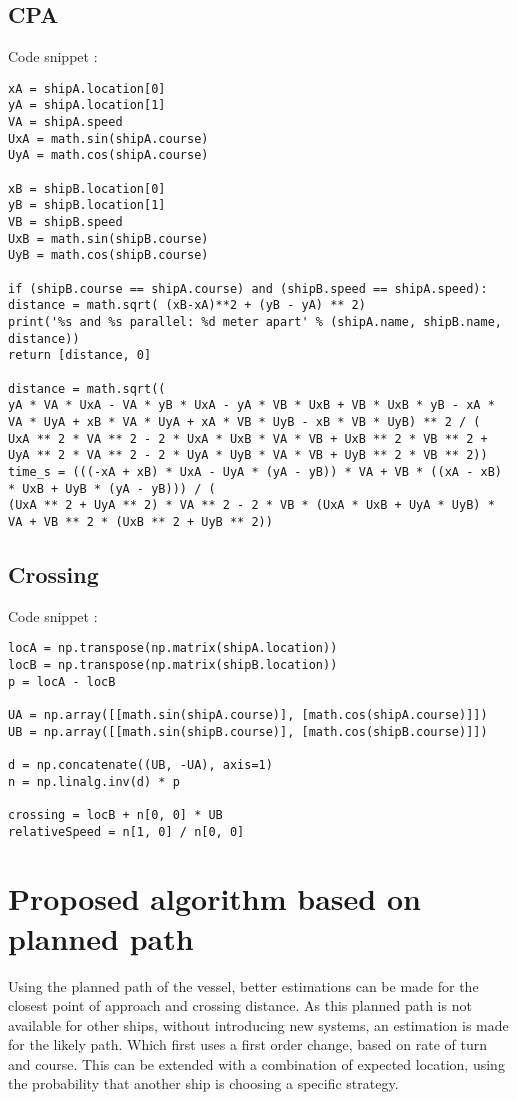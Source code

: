 \subsection{\ac{CPA}}
Code snippet :
\begin{lstlisting}
xA = shipA.location[0]
yA = shipA.location[1]
VA = shipA.speed
UxA = math.sin(shipA.course)
UyA = math.cos(shipA.course)

xB = shipB.location[0]
yB = shipB.location[1]
VB = shipB.speed
UxB = math.sin(shipB.course)
UyB = math.cos(shipB.course)

if (shipB.course == shipA.course) and (shipB.speed == shipA.speed):
distance = math.sqrt( (xB-xA)**2 + (yB - yA) ** 2)
print('%s and %s parallel: %d meter apart' % (shipA.name, shipB.name, distance))
return [distance, 0]

distance = math.sqrt((
yA * VA * UxA - VA * yB * UxA - yA * VB * UxB + VB * UxB * yB - xA * VA * UyA + xB * VA * UyA + xA * VB * UyB - xB * VB * UyB) ** 2 / (
UxA ** 2 * VA ** 2 - 2 * UxA * UxB * VA * VB + UxB ** 2 * VB ** 2 + UyA ** 2 * VA ** 2 - 2 * UyA * UyB * VA * VB + UyB ** 2 * VB ** 2))
time_s = (((-xA + xB) * UxA - UyA * (yA - yB)) * VA + VB * ((xA - xB) * UxB + UyB * (yA - yB))) / (
(UxA ** 2 + UyA ** 2) * VA ** 2 - 2 * VB * (UxA * UxB + UyA * UyB) * VA + VB ** 2 * (UxB ** 2 + UyB ** 2))
\end{lstlisting}

\subsection{Crossing}
Code snippet :
\begin{lstlisting}
locA = np.transpose(np.matrix(shipA.location))
locB = np.transpose(np.matrix(shipB.location))
p = locA - locB

UA = np.array([[math.sin(shipA.course)], [math.cos(shipA.course)]])
UB = np.array([[math.sin(shipB.course)], [math.cos(shipB.course)]])

d = np.concatenate((UB, -UA), axis=1)
n = np.linalg.inv(d) * p

crossing = locB + n[0, 0] * UB
relativeSpeed = n[1, 0] / n[0, 0]
\end{lstlisting}

\section{Proposed algorithm based on planned path}
Using the planned path of the vessel, better estimations can be made for the closest point of approach and crossing distance. As this planned path is not available for other ships, without introducing new systems, an estimation is made for the likely path. Which first uses a first order change, based on rate of turn and course. This can be extended with a combination of expected location, using the probability that another ship is choosing a specific strategy.

